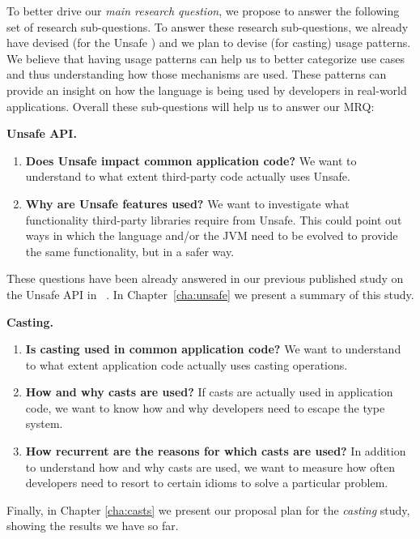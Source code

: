 To better drive our \emph{main research question}, we propose to answer the following set of research sub-questions.
To answer these research sub-questions, we already have devised (for the Unsafe \api{}) and we plan to devise (for casting) usage patterns.
We believe that having usage patterns can help us to better categorize use cases and thus understanding how those mechanisms are used.
These patterns can provide an insight on how the language is being used by developers in real-world applications.
Overall these sub-questions will help us to answer our MRQ:

\textbf{Unsafe API.}
\begin{enumerate}[label=$URQ\arabic*:$,ref=$URQ\arabic*$,leftmargin=3.4\parindent]
\item\label{unsafe:rq1}
{\bf Does Unsafe impact common application code?}
We want to understand to what extent third-party code actually uses Unsafe.

\item\label{unsafe:rq2}
{\bf Why are Unsafe features used?}
We want to investigate what functionality third-party libraries require from Unsafe.
This could point out ways in which the \java{} language and/or the JVM need to be evolved to provide the same functionality, but in a safer way.
\end{enumerate}

These questions have been already answered in our previous published study on the Unsafe API in \java{}~\cite{mastrangeloUseYourOwn2015}.
In Chapter~\ref{cha:unsafe} we present a summary of this study.

\textbf{Casting.}
\begin{enumerate}[label=$CRQ\arabic*:$,ref=$CRQ\arabic*$,leftmargin=3.4\parindent]
\item\label{casts:rq1}
{\bf Is casting used in common application code?}
We want to understand to what extent application code actually uses casting operations.

\item\label{casts:rq2}
{\bf How and why casts are used?}
If casts are actually used in application code,
we want to know how and why developers need to escape the type system.

\item\label{casts:rq3}
{\bf How recurrent are the reasons for which casts are used?}
In addition to understand how and why casts are used,
we want to measure how often developers need to resort to certain idioms to solve a particular problem.
\end{enumerate}

Finally, in Chapter \ref{cha:casts} we present our proposal plan for the \emph{casting} study, showing the results we have so far.


